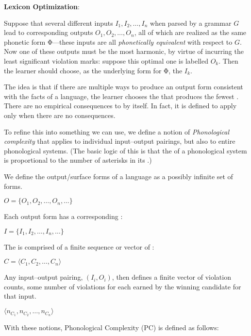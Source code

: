 \documentclass[output=paper,
modfonts
]{LSP/langsci}
\begin{document}
\ea
\textbf{Lexicon Optimization}:

Suppose that several different inputs $I_1, I_2, \ldots, I_n$ when parsed by a grammar $G$ lead to corresponding outputs $O_1, O_2, \ldots, O_n$, all of which are realized as the same phonetic form Φ---these inputs are all \emph{phonetically equivalent} with respect to $G$. Now one of these outputs must be the most harmonic, by virtue of incurring the least significant violation marks: suppose this optimal one is labelled $O_k$. Then the learner should choose, as the underlying form for Φ, the  $I_k$.
\z

\noindent The idea is that if there are multiple ways to produce an output form consistent with the facts of a language, the learner chooses the  that produces the fewest . There are no empirical consequences to  by itself. In fact, it is defined to apply only when there are no consequences.

To refine this into something we can use, we define a notion of \emph{Phonological complexity} that applies to individual input--output pairings, but also to entire phonological systems. (The basic logic of this is that the  of a phonological system is proportional to the number of asterisks in its .)

We define the output/surface forms of a language as a possibly infinite set of forms.

\ea
$O = \{O_1, O_2, \ldots, O_n, \ldots\}$
\z

\noindent Each output form has a corresponding :

\ea
$I = \{I_1, I_2, \ldots, I_n, \ldots\}$
\z

\noindent The  is comprised of a finite sequence or vector of :

\ea
$C = \langle C_1, C_2, \ldots, C_n\rangle$
\z

\noindent Any input--output pairing, $(I_i,O_i)$, then defines a finite vector of violation counts, some number of violations for each  earned by the winning candidate for that input.

\ea
$\langle n_{C_1}, n_{C_2}, \ldots, n_{C_n}\rangle$
\z

With these notions, Phonological Complexity (PC) is defined as follows:
\end{document}
